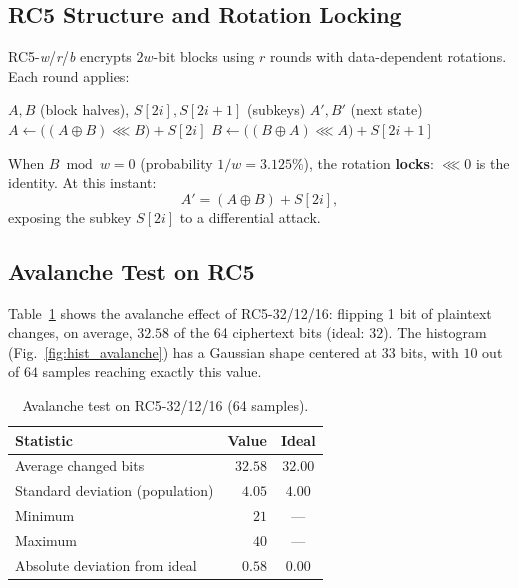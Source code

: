 \documentclass[12pt,a4paper]{article}
\theoremstyle{plain}
\begin{document}
\subsection{RC5 Structure and Rotation Locking}

RC5-\emph{w}/\emph{r}/\emph{b} encrypts $2w$-bit blocks using
$r$ rounds with data-dependent rotations. Each round applies:

\begin{algorithm}[H]
\caption{RC5: one-round encryption}
\label{alg:rc5_round}
\begin{algorithmic}[1]
\Require $A,B$ (block halves), $S[2i],S[2i+1]$ (subkeys)
\Ensure $A',B'$ (next state)
\State $A \gets \bigl((A \oplus B) \lll B\bigr) + S[2i]$
\State $B \gets \bigl((B \oplus A) \lll A\bigr) + S[2i+1]$
\end{algorithmic}
\end{algorithm}

When $B \bmod w = 0$ (probability $1/w = 3.125\%$), the rotation
\textbf{locks}: $\lll 0$ is the identity. At this instant:
\[
A' = (A \oplus B) + S[2i],
\]
exposing the subkey $S[2i]$ to a differential attack.

\subsection{Avalanche Test on RC5}

Table~\ref{tab:avalanche} shows the avalanche effect of RC5-32/12/16:
flipping 1 bit of plaintext changes, on average, $32.58$ of the 64
ciphertext bits (ideal: $32$). The histogram (Fig.~\ref{fig:hist_avalanche})
has a Gaussian shape centered at $33$ bits, with $10$ out of $64$
samples reaching exactly this value.

\begin{table}[htbp]
\centering
\caption{Avalanche test on RC5-32/12/16 (64 samples).}
\label{tab:avalanche}
\begin{tabular}{lrc}
\hline
Statistic & Value & Ideal \\
\hline
Average changed bits & $32.58$ & $32.00$ \\
Standard deviation (population) & $4.05$ & $4.00$ \\
Minimum & $21$ & --- \\
Maximum & $40$ & --- \\
Absolute deviation from ideal & $0.58$ & $0.00$ \\
\hline
\end{tabular}
\end{table}
\end{document}
